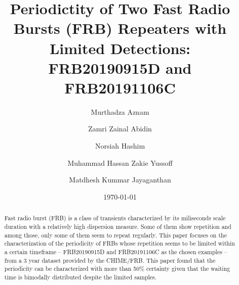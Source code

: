 \documentclass[reprint,amsmath,amssymb,showkeys,prd]{revtex4-2}
\begin{document}

\title{Periodictity of Two Fast Radio Bursts (FRB) Repeaters with Limited Detections: FRB20190915D and FRB20191106C}

\author{Murthadza Aznam}
\author{Zamri Zainal Abidin}
\author{Norsiah Hashim}
\author{Muhammad Hassan Zakie Yussoff}
\author{Matdhesh Kummar Jayaganthan}


\date{\today}

\begin{abstract}
Fast radio burst (FRB) is a class of transients characterized by its miliseconds scale duration with a relatively high dispersion measure. 
Some of them show repetition and among those, only some of them seem to repeat regularly.
This paper focuses on the characterization of the periodicity of FRBs whose repetition seems to be limited within a certain timeframe -- FRB20190915D and FRB20191106C as the chosen examples -- from a 3 year dataset provided by the CHIME/FRB.
This paper found that the periodicity can be characterized with more than 50\% certainty given that the waiting time is bimodally distributed despite the limited samples.


\end{abstract}
\end{document}
